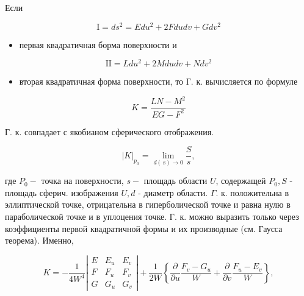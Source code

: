 \documentclass[10pt]{article}
\begin{document}
Если



\[

\mathrm{I}=d s^{2}=E d u^{2}+2 F d u d v+G d v^{2}

\]



\begin{itemize}

  \item первая квадратичная борма поверхности и

\end{itemize}



\[

\mathrm{II}=L d u^{2}+2 M d u d v+N d v^{2}

\]



\begin{itemize}

  \item вторая квадратичная форма поверхности, то Г. к. вычисляется по формуле

\end{itemize}



\[

K=\frac{L N-M^{2}}{E G-F^{2}}

\]



Г. к. совпадает с якобианом сферического отображения.



\[

|K|_{p_{0}}=\lim _{d(\mathrm{~s}) \rightarrow 0} \frac{S}{s},

\]



где $P_{0}-$ точка на поверхности, $s-$ площадь области $U$, содержащей $P_{0}, S$ - площадь сферич. изображения $U, d$ - диаметр области. $\Gamma$. к. положительна в эллиптической точке, отрицательна в гиперболической точке и равна нулю в параболической точке и в уплоцения точке. Г. к. можно выразить только через коэффициенты первой квадратичной формы и их производные (см. Гаусса теорема). Именно,



\[

K=-\frac{1}{4 W^{4}}\left|\begin{array}{lll}

E & E_{u} & E_{v} \\

F & F_{u} & F_{v} \\

G & G_{u} & G_{v}

\end{array}\right|+\frac{1}{2 W}\left\{\frac{\partial}{\partial u} \frac{F_{v}-G_{u}}{W}+\frac{\partial}{\partial v} \frac{F_{u}-E_{v}}{W}\right\},

\]
\end{document}
